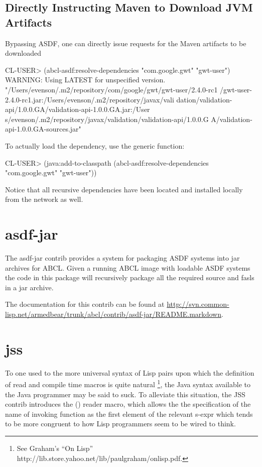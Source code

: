 \documentclass[10pt]{book}
\begin{document}
\subsection{Directly Instructing Maven to Download JVM Artifacts}

Bypassing \textsc{ASDF}, one can directly issue requests for the Maven
artifacts to be downloaded

\begin{listing-lisp}
CL-USER> (abcl-asdf:resolve-dependencies "com.google.gwt"
                                         "gwt-user")
WARNING: Using LATEST for unspecified version.
"/Users/evenson/.m2/repository/com/google/gwt/gwt-user/2.4.0-rc1
/gwt-user-2.4.0-rc1.jar:/Users/evenson/.m2/repository/javax/vali
dation/validation-api/1.0.0.GA/validation-api-1.0.0.GA.jar:/User
s/evenson/.m2/repository/javax/validation/validation-api/1.0.0.G
A/validation-api-1.0.0.GA-sources.jar"
\end{listing-lisp}

To actually load the dependency, use the  generic
function:

\begin{listing-lisp}
CL-USER> (java:add-to-classpath
          (abcl-asdf:resolve-dependencies "com.google.gwt"
                                          "gwt-user"))
\end{listing-lisp}

Notice that all recursive dependencies have been located and installed
locally from the network as well.

\section{asdf-jar}

The asdf-jar contrib provides a system for packaging ASDF systems into
jar archives for ABCL.  Given a running ABCL image with loadable ASDF
systems the code in this package will recursively package all the
required source and fasls in a jar archive.

The documentation for this contrib can be found at
\url{http://svn.common-lisp.net/armedbear/trunk/abcl/contrib/asdf-jar/README.markdown}.


\section{jss}
\label{section:jss}

To one used to the more universal syntax of Lisp pairs upon which the
definition of read and compile time macros is quite
natural \footnote{See Graham's ``On Lisp''
  http://lib.store.yahoo.net/lib/paulgraham/onlisp.pdf.}, the Java
syntax available to the Java programmer may be said to suck.  To
alleviate this situation, the JSS contrib introduces the
 () reader macro, which allows
the the specification of the name of invoking function as the first
element of the relevant s-expr which tends to be more congruent to how
Lisp programmers seem to be wired to think.
\end{document}
